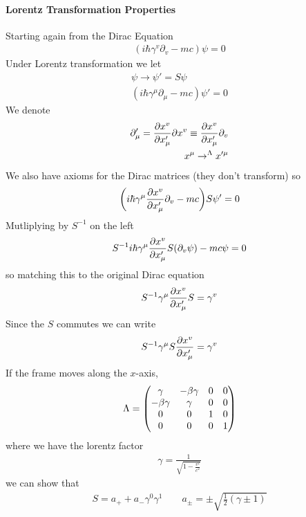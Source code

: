 \documentclass[../main.tex]{subfiles}
\begin{document}
\paragraph*{Lorentz Transformation Properties}
Starting again from the Dirac Equation
\begin{align*}
    (i\hbar \gamma^v\partial_v - mc) \psi = 0
\end{align*}
Under Lorentz transformation we let
\begin{align*}
    \psi \to \psi' = S \psi \\
    (i\hbar \gamma^\mu \partial_\mu - mc) \psi' = 0
\end{align*}
We denote 
\begin{align*}
    \partial_\mu ' = \pdv{x^v}{x_\mu'} \partial{x^v} \equiv \pdv{x^v}{x_\mu'} \partial_v \\
    x^\mu \to^\Lambda x'^\mu
\end{align*}
We also have axioms for the Dirac matrices (they don't transform)
so 
\begin{align*}
    \qt(i\hbar \gamma^\mu \pdv{x^v}{x_\mu'} \partial_v - mc) S\psi' = 0
\end{align*}
Mutliplying by $S^{-1}$ on the left
\begin{align*}
    S^{-1} i\hbar \gamma^\mu\pdv{x^v}{x_\mu'} S (\partial_v  \psi) - mc \psi = 0
\end{align*}
so matching this to the original Dirac equation
\begin{align*}
    S^{-1} \gamma^\mu \pdv{x^v}{x_\mu'} S = \gamma^v
\end{align*}
Since the $S$ commutes we can write
\begin{align*}
    S^{-1} \gamma^\mu S \pdv{x^v}{x_\mu'} = \gamma^v
\end{align*}
If the frame moves along the $x$-axis, 
\begin{align*}
    \Lambda = \mqty(\gamma & -\beta \gamma & 0 & 0 \\ -\beta \gamma & \gamma & 0 & 0 \\ 0 & 0 & 1 & 0 \\ 0 & 0 & 0 & 1)
\end{align*}
where we have the lorentz factor 
\begin{align*}
    \gamma = \frac{1}{\sqrt{1 - \frac{v^2}{c^2}}}
\end{align*}
we can show that
\begin{align*}
    S = a_+ + a_- \gamma^0 \gamma^1 \qquad a_{\pm} = \pm \sqrt{\frac{1}{2} (\gamma \pm 1)}
\end{align*}
\end{document}
